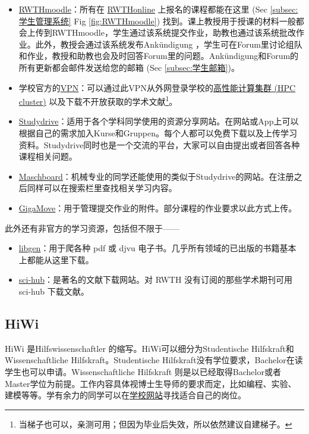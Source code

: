     \begin{itemize}
      \item \href{https://moodle.rwth-aachen.de/}{RWTHmoodle}：所有在 \href{https://online.rwth-aachen.de/}{RWTHonline} 上报名的课程都能在这里 (Sec \ref{subsec:学生管理系统} Fig \ref{fig:RWTHmoodle}) 找到。课上教授用于授课的材料一般都会上传到RWTHmoodle，学生通过该系统提交作业，助教也通过该系统批改作业。此外，教授会通过该系统发布Ankündigung ，学生可在Forum里讨论组队和作业，教授和助教也会及时回答Forum里的问题。Ankündigung和Forum的所有更新都会邮件发送给您的邮箱 (Sec \ref{subsec:学生邮箱})。
      \item 学校官方的\href{https://help.itc.rwth-aachen.de/service/vbf6fx0gom76/}{VPN}：可以通过此VPN从外网登录学校的\href{https://help.itc.rwth-aachen.de/service/rhr4fjjutttf/}{高性能计算集群 (HPC cluster)} 以及下载不开放获取的学术文献\footnote{当梯子也可以，亲测可用；但因为毕业后失效，所以依然建议自建梯子。}。
      \item \href{http://www.studydrive.net/}{Studydrive}：适用于各个学科同学使用的资源分享网站。在网站或App上可以根据自己的需求加入Kurse和Gruppen。每个人都可以免费下载以及上传学习资料。Studydrive同时也是一个交流的平台，大家可以自由提出或者回答各种课程相关问题。
      \item \href{https://www.maschboard.de/forum/}{Maschboard}：机械专业的同学还能使用的类似于Studydrive的网站。在注册之后同样可以在搜索栏里查找相关学习内容。
      \item \href{https://gigamove.rz.rwth-aachen.de/}{GigaMove}：用于管理提交作业的附件。部分课程的作业要求以此方式上传。
    \end{itemize}

    此外还有非官方的学习资源，包括但不限于——

    \begin{itemize}
      \item \href{https://gigamove.rz.rwth-aachen.de/}{libgen}：用于爬各种 pdf 或 djvu 电子书。几乎所有领域的已出版的书籍基本上都能从这里下载。
      \item \href{https://gigamove.rz.rwth-aachen.de/}{sci-hub}：是著名的文献下载网站。对 RWTH 没有订阅的那些学术期刊可用 sci-hub 下载文献。
    \end{itemize}

  \subsection{HiWi}\label{subsec:HiWi}

    HiWi 是Hilfswissenschaftler 的缩写。HiWi可以细分为Studentische Hilfskraft和Wissenschaftliche Hilfskraft。Studentische Hilfskraft没有学位要求，Bachelor在读学生也可以申请。Wissenschaftliche Hilfskraft 则是以已经取得Bachelor或者Master学位为前提。工作内容具体视博士生导师的要求而定，比如编程、实验、建模等等。学有余力的同学可以在\href{https://www.rwth-aachen.de/go/id/buym/}{学校网站}寻找适合自己的岗位。


